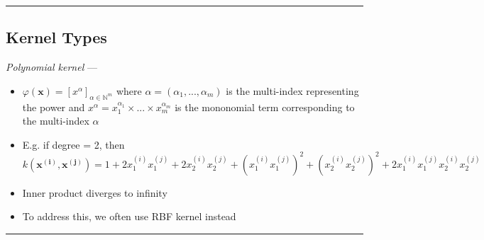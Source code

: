 {\color{black}\hrule height 0.001mm}

\subsection*{Kernel Types}
\emph{Polynomial kernel} ---
\begin{itemize}
    \item $\varphi(\boldsymbol{x}) = [ 
    x^\alpha ]_{\alpha \in \mathbb{N}^m}$ where $\alpha = (\alpha_1, ..., \alpha_m)$ is the multi-index representing the power and $x^\alpha = x_1^{\alpha_1} \times ... \times  x_m^{\alpha_m}$ is the mononomial term corresponding to the multi-index $\alpha$
    \item E.g. if degree = 2, then $k( \boldsymbol{x^{(i)}}, \boldsymbol{x^{(j)}} ) = 1 + 2 x_1^{(i)} x_1^{(j)} + 2 x_2^{(i)} x_2^{(j)} + ( x_1^{(i)} x_1^{(j)} )^2 + ( x_2^{(i)} x_2^{(j)} )^2 + 2 x_1^{(i)} x_1^{(j)} x_2^{(i)} x_2^{(j)}$
    \item Inner product diverges to infinity
    \item To address this, we often use RBF kernel instead
\end{itemize}

{\color{lightgray}\hrule height 0.001mm}

